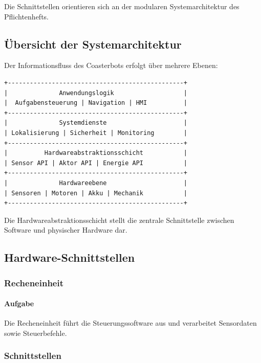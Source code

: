 \documentclass[
  a4paper,
  12pt,
  DIV=12,        %
  parskip=half,  %
  headings=small %
]{scrartcl}
\theoremstyle{definition}
\theoremstyle{definition}
\begin{document}
Die Schnittstellen orientieren sich an der modularen Systemarchitektur
des Pflichtenhefts.

\subsection{Übersicht der
Systemarchitektur}\label{uxfcbersicht-der-systemarchitektur}

Der Informationsfluss des Coasterbots erfolgt über mehrere Ebenen:

\begin{verbatim}
+------------------------------------------------+
|              Anwendungslogik                   |
|  Aufgabensteuerung | Navigation | HMI          |
+------------------------------------------------+
|              Systemdienste                     |
| Lokalisierung | Sicherheit | Monitoring        |
+------------------------------------------------+
|          Hardwareabstraktionsschicht           |
| Sensor API | Aktor API | Energie API           |
+------------------------------------------------+
|              Hardwareebene                     |
| Sensoren | Motoren | Akku | Mechanik           |
+------------------------------------------------+
\end{verbatim}

Die Hardwareabstraktionsschicht stellt die zentrale Schnittstelle
zwischen Software und physischer Hardware dar.

\subsection{Hardware-Schnittstellen}\label{hardware-schnittstellen}

\subsubsection{Recheneinheit}\label{recheneinheit-1}

\paragraph{Aufgabe}\label{aufgabe-12}

Die Recheneinheit führt die Steuerungssoftware aus und verarbeitet
Sensordaten sowie Steuerbefehle.

\subsubsection{Schnittstellen}\label{schnittstellen-1}
\end{document}
